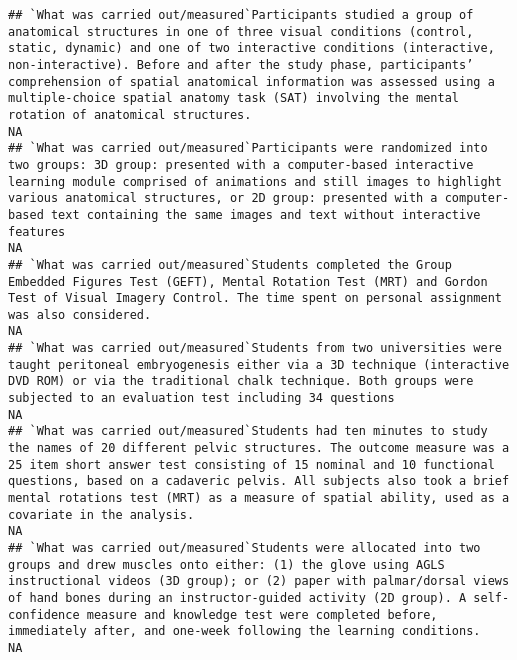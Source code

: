 \documentclass[]{article}
\begin{document}
\begin{verbatim}
## `What was carried out/measured`Participants studied a group of anatomical structures in one of three visual conditions (control, static, dynamic) and one of two interactive conditions (interactive, non-interactive). Before and after the study phase, participants’ comprehension of spatial anatomical information was assessed using a multiple-choice spatial anatomy task (SAT) involving the mental rotation of anatomical structures.                                         NA
## `What was carried out/measured`Participants were randomized into two groups: 3D group: presented with a computer-based interactive learning module comprised of animations and still images to highlight various anatomical structures, or 2D group: presented with a computer-based text containing the same images and text without interactive features                                                                                                                              NA
## `What was carried out/measured`Students completed the Group Embedded Figures Test (GEFT), Mental Rotation Test (MRT) and Gordon Test of Visual Imagery Control. The time spent on personal assignment was also considered.                                                                                                                                                                                                                                                              NA
## `What was carried out/measured`Students from two universities were taught peritoneal embryogenesis either via a 3D technique (interactive DVD ROM) or via the traditional chalk technique. Both groups were subjected to an evaluation test including 34 questions                                                                                                                                                                                                                      NA
## `What was carried out/measured`Students had ten minutes to study the names of 20 different pelvic structures. The outcome measure was a 25 item short answer test consisting of 15 nominal and 10 functional questions, based on a cadaveric pelvis. All subjects also took a brief mental rotations test (MRT) as a measure of spatial ability, used as a covariate in the analysis.                                                                                                   NA
## `What was carried out/measured`Students were allocated into two groups and drew muscles onto either: (1) the glove using AGLS instructional videos (3D group); or (2) paper with palmar/dorsal views of hand bones during an instructor-guided activity (2D group). A self-confidence measure and knowledge test were completed before, immediately after, and one-week following the learning conditions.                                                                              NA

\end{verbatim}
\end{document}
